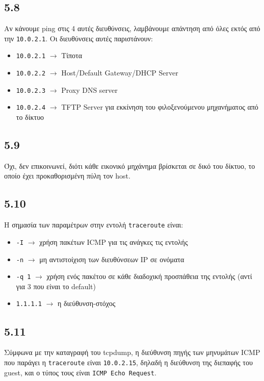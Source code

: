 \documentclass[a4paper, 12pt]{article}
\begin{document}
	\subsection*{5.8}
		Αν κάνουμε ping στις 4 αυτές διευθύνσεις, λαμβάνουμε απάντηση από όλες εκτός από την \verb|10.0.2.1|. Οι διευθύνσεις αυτές παριστάνουν:
		
		\begin{itemize}
			\item \verb|10.0.2.1| $\rightarrow$ Τίποτα
			\item \verb|10.0.2.2| $\rightarrow$ Host/Default Gateway/DHCP Server
			\item \verb|10.0.2.3| $\rightarrow$ Proxy DNS server
			\item \verb|10.0.2.4| $\rightarrow$ TFTP Server για εκκίνηση του φιλοξενούμενου μηχανήματος από το δίκτυο
		\end{itemize}

	\subsection*{5.9}
		Όχι, δεν επικοινωνεί, διότι κάθε εικονικό μηχάνημα βρίσκεται σε δικό του δίκτυο, το οποίο έχει προκαθορισμένη πύλη τον host.

	\subsection*{5.10}
		Η σημασία των παραμέτρων στην εντολή \verb|traceroute| είναι:
		
		\begin{itemize}
			\item \verb|-Ι| $\rightarrow$ χρήση πακέτων ICMP για τις ανάγκες τις εντολής
			\item \verb|-n| $\rightarrow$ μη αντιστοίχιση των διευθύνσεων IP σε ονόματα
			\item \verb|-q 1| $\rightarrow$ χρήση ενός πακέτου σε κάθε διαδοχική προσπάθεια της εντολής (αντί για 3 που είναι το default)
			\item \verb|1.1.1.1| $\rightarrow$ η διεύθυνση-στόχος
		\end{itemize}

	\subsection*{5.11}
		Σύμφωνα με την καταγραφή του tcpdump, η διεύθυνση πηγής των μηνυμάτων ICMP που παράγει η \verb|traceroute| είναι \verb|10.0.2.15|, δηλαδή η διεύθυνση της διεπαφής του guest, και ο τύπος τους είναι \verb|ICMP Echo Request|.
\end{document}
